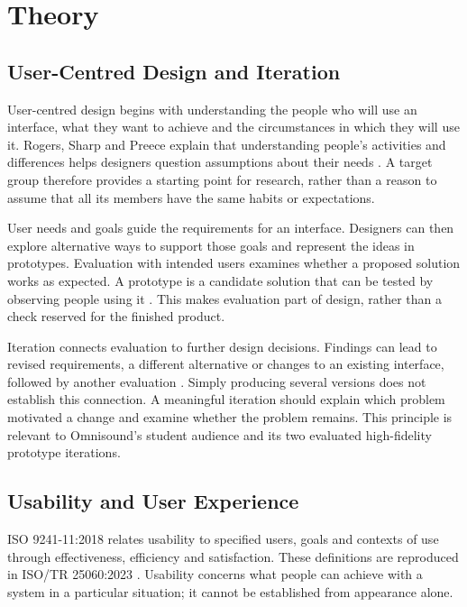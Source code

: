 \chapter{Theory}
\label{chap:theory}

\section{User-Centred Design and Iteration}
\label{sec:ucd-iteration}

User-centred design begins with understanding the people who will use an
interface, what they want to achieve and the circumstances in which they
will use it. Rogers, Sharp and Preece explain that understanding people's
activities and differences helps designers question assumptions about their
needs \cite[pp.~16--17]{interactiondesign2023}. A target group therefore
provides a starting point for research, rather than a reason to assume that
all its members have the same habits or expectations.

User needs and goals guide the requirements for an interface. Designers can
then explore alternative ways to support those goals and represent the ideas
in prototypes. Evaluation with intended users examines whether a proposed
solution works as expected. A prototype is a candidate solution that can be
tested by observing people using it \cite[Sec.~``What Is a Testable
Prototype?'']{perniceprototypes}. This makes evaluation part of design,
rather than a check reserved for the finished product.

Iteration connects evaluation to further design decisions. Findings can lead
to revised requirements, a different alternative or changes to an existing
interface, followed by another evaluation \cite[Sec.~``Why Test a
Prototype?'']{perniceprototypes}. Simply producing several versions does not
establish this connection. A meaningful iteration should explain which
problem motivated a change and examine whether the problem remains. This
principle is relevant to Omnisound's student audience and its two evaluated
high-fidelity prototype iterations.

\section{Usability and User Experience}
\label{sec:usability-ux}

ISO 9241-11:2018 relates usability to specified users, goals and contexts of
use through effectiveness, efficiency and satisfaction. These definitions
are reproduced in ISO/TR 25060:2023 \cite[Sec.~3.1]{isocif2023}. Usability
concerns what people can achieve with a system in a particular situation;
it cannot be established from appearance alone.

